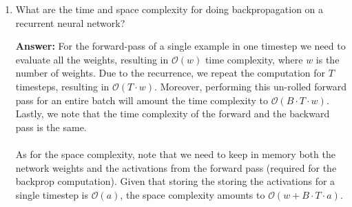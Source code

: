 \documentclass{article}
\newenvironment{QandA}{\begin{enumerate}[label=\arabic*.]}{\end{enumerate}}
\newenvironment{answer}{\par\normalfont \textbf{Answer:}}{}
\begin{document}
\begin{QandA}
\begin{answer}
        (Source: \href{https://ai.stackexchange.com/questions/15986/what-are-examples-of-promising-ai-ml-techniques-that-are-computationally-intract}{StackExchange})
    \end{answer}

    \item What are the time and space complexity for doing backpropagation on a recurrent neural network?
    \begin{answer}
        For the forward-pass of a single example in one timestep we need to evaluate all the weights, resulting in $\mathcal{O}(w)$ time complexity, where $w$ is the number of weights. Due to the recurrence, we repeat the computation for $T$ timesteps, resulting in $\mathcal{O}(T \cdot w)$. Moreover, performing this un-rolled forward pass for an entire batch will amount the time complexity to $\mathcal{O}(B \cdot T \cdot w)$. Lastly, we note that the time complexity of the forward and the backward pass is the same.\\\\
        As for the space complexity, note that we need to keep in memory both the network weights and the activations from the forward pass (required for the backprop computation). Given that storing the storing the activations for a single timestep is $\mathcal{O}(a)$, the space complexity amounts to $\mathcal{O}(w + B \cdot T \cdot a)$.
    \end{answer}


\end{QandA}
\end{document}
